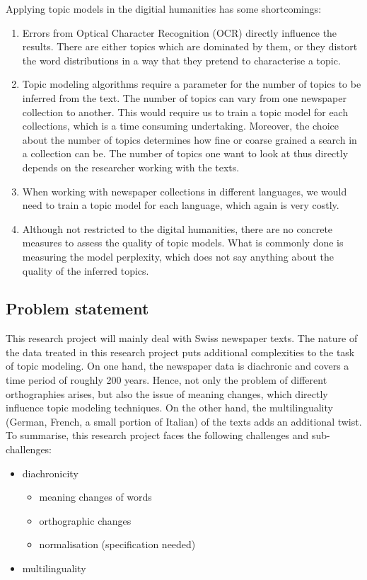 Applying topic models in the digitial humanities has some shortcomings: 

\begin{enumerate}
    \item Errors from Optical Character Recognition (OCR) directly influence the results. There are either topics which are dominated by them, or they distort the word distributions in a way that they pretend to characterise a topic.
    \item Topic modeling algorithms require a parameter for the number of topics to be inferred from the text. The number of topics can vary from one newspaper collection to another. This would require us to train a topic model for each collections, which is a time consuming undertaking. Moreover, the choice about the number of topics determines how fine or coarse grained a search in a collection can be. The number of topics one want to look at thus directly depends on the researcher working with the texts.
    \item When working with newspaper collections in different languages, we would need to train a topic model for each language, which again is very costly.
    \item Although not restricted to the digital humanities, there are no concrete measures to assess the quality of topic models. What is commonly done is measuring the model perplexity, which does not say anything about the quality of the inferred topics.
\end{enumerate}


\subsection{Problem statement}
This research project will mainly deal with Swiss newspaper texts. The nature of the data treated in this research project puts additional complexities to the task of topic modeling. On one hand, the newspaper data is diachronic and covers a time period of roughly 200 years. Hence, not only the problem of different orthographies arises, but also the issue of meaning changes, which directly influence topic modeling techniques. On the other hand, the multilinguality (German, French, a small portion of Italian) of the texts adds an additional twist. To summarise, this research project faces the following challenges and sub-challenges:

\begin{itemize}
	\item diachronicity
	\begin{itemize}
		\item meaning changes of words
		\item orthographic changes
		\item normalisation (specification needed)
	\end{itemize}
	\item multilinguality
	
\end{itemize}

